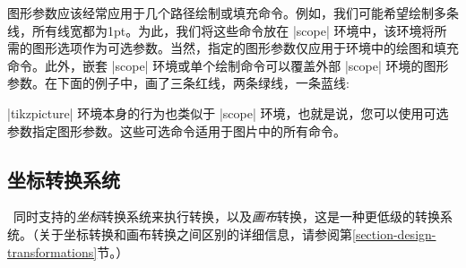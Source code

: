 图形参数应该经常应用于几个路径绘制或填充命令。例如，我们可能希望绘制多条线，所有线宽都为1pt。为此，我们将这些命令放在 |{scope}| 环境中，该环境将所需的图形选项作为可选参数。当然，指定的图形参数仅应用于环境中的绘图和填充命令。此外，嵌套 |{scope}| 环境或单个绘制命令可以覆盖外部 |{scope}| 环境的图形参数。在下面的例子中，画了三条红线，两条绿线，一条蓝线:
%
\begin{codeexample}[]
\begin{tikzpicture}
  \begin{scope}[color=red]
    \draw (0mm,10mm) -- (10mm,10mm);
    \draw (0mm, 8mm) -- (10mm, 8mm);
    \draw (0mm, 6mm) -- (10mm, 6mm);
  \end{scope}
  \begin{scope}[color=green]
    \draw             (0mm, 4mm) -- (10mm, 4mm);
    \draw             (0mm, 2mm) -- (10mm, 2mm);
    \draw[color=blue] (0mm, 0mm) -- (10mm, 0mm);
  \end{scope}
\end{tikzpicture}
\end{codeexample}


|{tikzpicture}| 环境本身的行为也类似于 |{scope}| 环境，也就是说，您可以使用可选参数指定图形参数。这些可选命令适用于图片中的所有命令。


\subsection{坐标转换系统}


\tikzname\ 同时支持\pgfname 的\emph{坐标}转换系统来执行转换，以及\emph{画布}转换，这是一种更低级的转换系统。（关于坐标转换和画布转换之间区别的详细信息，请参阅第\ref{section-design-transformations}节。）


